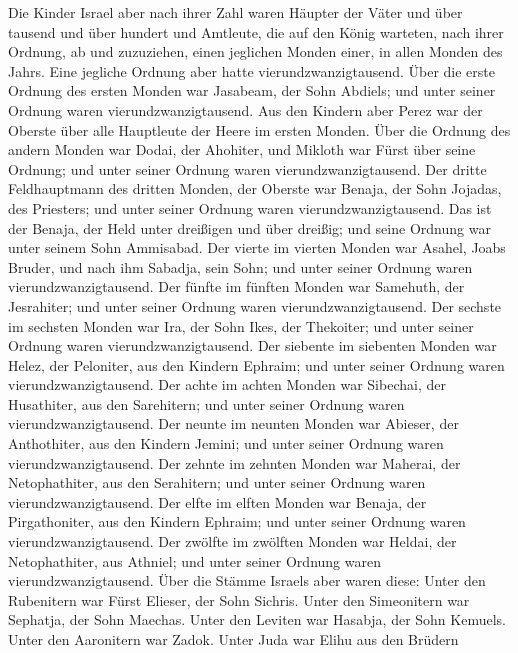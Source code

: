  Die Kinder Israel aber nach ihrer Zahl waren Häupter der
Väter und über tausend und über hundert und Amtleute, die auf den König
warteten, nach ihrer Ordnung, ab und zuzuziehen, einen jeglichen Monden
einer, in allen Monden des Jahrs. Eine jegliche Ordnung aber hatte
vierundzwanzigtausend.  Über die erste Ordnung des ersten
Monden war Jasabeam, der Sohn Abdiels; und unter seiner Ordnung waren
vierundzwanzigtausend.  Aus den Kindern aber Perez war der
Oberste über alle Hauptleute der Heere im ersten Monden. 
Über die Ordnung des andern Monden war Dodai, der Ahohiter, und Mikloth
war Fürst über seine Ordnung; und unter seiner Ordnung waren
vierundzwanzigtausend.  Der dritte Feldhauptmann des dritten
Monden, der Oberste war Benaja, der Sohn Jojadas, des Priesters; und
unter seiner Ordnung waren vierundzwanzigtausend.  Das ist
der Benaja, der Held unter dreißigen und über dreißig; und seine Ordnung
war unter seinem Sohn Ammisabad.  Der vierte im vierten
Monden war Asahel, Joabs Bruder, und nach ihm Sabadja, sein Sohn; und
unter seiner Ordnung waren vierundzwanzigtausend.  Der
fünfte im fünften Monden war Samehuth, der Jesrahiter; und unter seiner
Ordnung waren vierundzwanzigtausend.  Der sechste im
sechsten Monden war Ira, der Sohn Ikes, der Thekoiter; und unter seiner
Ordnung waren vierundzwanzigtausend.  Der siebente im
siebenten Monden war Helez, der Peloniter, aus den Kindern Ephraim; und
unter seiner Ordnung waren vierundzwanzigtausend.  Der
achte im achten Monden war Sibechai, der Husathiter, aus den Sarehitern;
und unter seiner Ordnung waren vierundzwanzigtausend.  Der
neunte im neunten Monden war Abieser, der Anthothiter, aus den Kindern
Jemini; und unter seiner Ordnung waren vierundzwanzigtausend.
 Der zehnte im zehnten Monden war Maherai, der
Netophathiter, aus den Serahitern; und unter seiner Ordnung waren
vierundzwanzigtausend.  Der elfte im elften Monden war
Benaja, der Pirgathoniter, aus den Kindern Ephraim; und unter seiner
Ordnung waren vierundzwanzigtausend.  Der zwölfte im
zwölften Monden war Heldai, der Netophathiter, aus Athniel; und unter
seiner Ordnung waren vierundzwanzigtausend.  Über die
Stämme Israels aber waren diese: Unter den Rubenitern war Fürst Elieser,
der Sohn Sichris. Unter den Simeonitern war Sephatja, der Sohn Maechas.
 Unter den Leviten war Hasabja, der Sohn Kemuels. Unter den
Aaronitern war Zadok.  Unter Juda war Elihu aus den Brüdern
